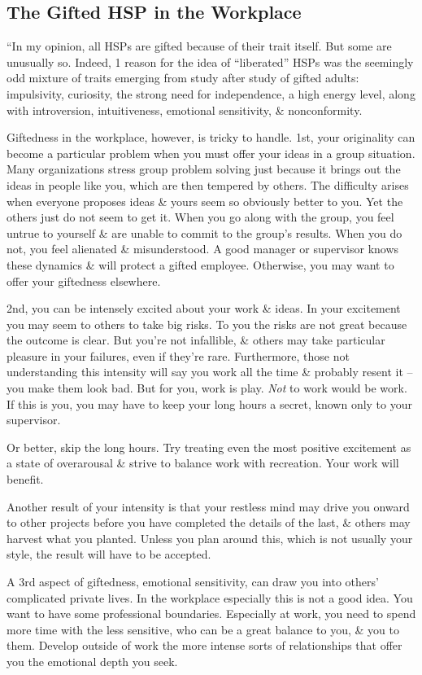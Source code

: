 \documentclass{article}
\numberwithin{equation}{section}
\begin{document}
\subsection{The Gifted HSP in the Workplace}
``In my opinion, all HSPs are gifted because of their trait itself. But some are unusually so. Indeed, 1 reason for the idea of ``liberated'' HSPs was the seemingly odd mixture of traits emerging from study after study of gifted adults: impulsivity, curiosity, the strong need for independence, a high energy level, along with introversion, intuitiveness, emotional sensitivity, \& nonconformity.

Giftedness in the workplace, however, is tricky to handle. 1st, your originality can become a particular problem when you must offer your ideas in a group situation. Many organizations stress group problem solving just because it brings out the ideas in people like you, which are then tempered by others. The difficulty arises when everyone proposes ideas \& yours seem so obviously better to you. Yet the others just do not seem to get it. When you go along with the group, you feel untrue to yourself \& are unable to commit to the group's results. When you do not, you feel alienated \& misunderstood. A good manager or supervisor knows these dynamics \& will protect a gifted employee. Otherwise, you may want to offer your giftedness elsewhere.

2nd, you can be intensely excited about your work \& ideas. In your excitement you may seem to others to take big risks. To you the risks are not great because the outcome is clear. But you're not infallible, \& others may take particular pleasure in your failures, even if they're rare. Furthermore, those not understanding this intensity will say you work all the time \& probably resent it -- you make them look bad. But for you, work is play. \textit{Not} to work would be work. If this is you, you may have to keep your long hours a secret, known only to your supervisor.

Or better, skip the long hours. Try treating even the most positive excitement as a state of overarousal \& strive to balance work with recreation. Your work will benefit.

Another result of your intensity is that your restless mind may drive you onward to other projects before you have completed the details of the last, \& others may harvest what you planted. Unless you plan around this, which is not usually your style, the result will have to be accepted.

A 3rd aspect of giftedness, emotional sensitivity, can draw you into others' complicated private lives. In the workplace especially this is not a good idea. You want to have some professional boundaries. Especially at work, you need to spend more time with the less sensitive, who can be a great balance to you, \& you to them. Develop outside of work the more intense sorts of relationships that offer you the emotional depth you seek.
\end{document}
